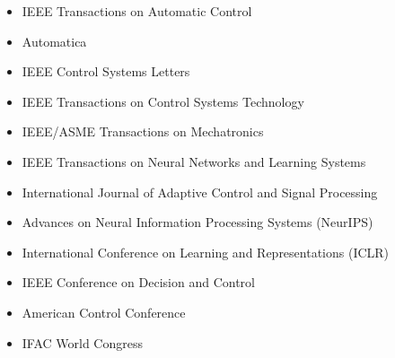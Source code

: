 \documentclass[10pt, letterpaper]{article}
\begin{document}
\begin{itemize}
    \setlength{\itemsep}{0pt} %
    \item IEEE Transactions on Automatic Control
    \item Automatica
    \item IEEE Control Systems Letters
    \item IEEE Transactions on Control Systems Technology
    \item IEEE/ASME Transactions on Mechatronics
    \item IEEE Transactions on Neural Networks and Learning Systems
    \item International Journal of Adaptive Control and Signal Processing
    \item Advances on Neural Information Processing Systems (NeurIPS)
    \item International Conference on Learning and Representations (ICLR)
    \item IEEE Conference on Decision and Control
    \item American Control Conference
    \item IFAC World Congress
\end{itemize}

\label{LastPage}
    

    
\end{document}

